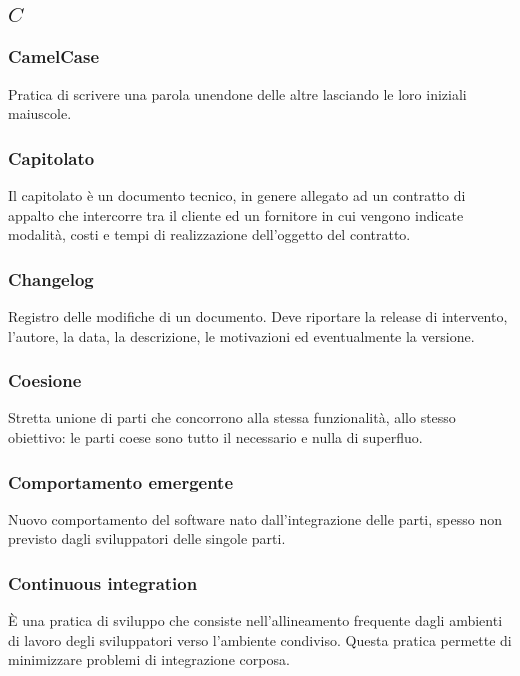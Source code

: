 \subsection*{\quad$C\quad$}
\subsubsection*{CamelCase}
Pratica di scrivere una parola unendone delle altre lasciando le loro iniziali maiuscole.

\subsubsection*{Capitolato}
Il capitolato è un documento tecnico, in genere allegato ad un contratto di appalto che intercorre tra il cliente ed un fornitore in cui vengono indicate modalità, costi e tempi di realizzazione dell'oggetto del contratto.

\subsubsection*{Changelog}
Registro delle modifiche di un documento. Deve riportare la release di intervento, l'autore, la data, la descrizione, le motivazioni ed eventualmente la versione.

\subsubsection*{Coesione}
Stretta unione di parti che concorrono alla stessa funzionalità, allo stesso obiettivo: le parti coese sono tutto il necessario e nulla di superfluo.

\subsubsection*{Comportamento emergente}
Nuovo comportamento del software nato dall'integrazione delle parti, spesso non previsto dagli sviluppatori delle singole parti.

\subsubsection*{Continuous integration}
 È una pratica di sviluppo che consiste nell'allineamento frequente dagli ambienti di lavoro degli sviluppatori verso l’ambiente condiviso. Questa pratica permette di minimizzare problemi di integrazione corposa.

